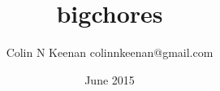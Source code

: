 \documentclass[12pt,letterpaper]{article}
\begin{document}
\title{bigchores{}}
\author{Colin N Keenan colinnkeenan@gmail.com}
\date{June 2015}
\section*{\bigchores}

\section*{\shower}

\end{document}
